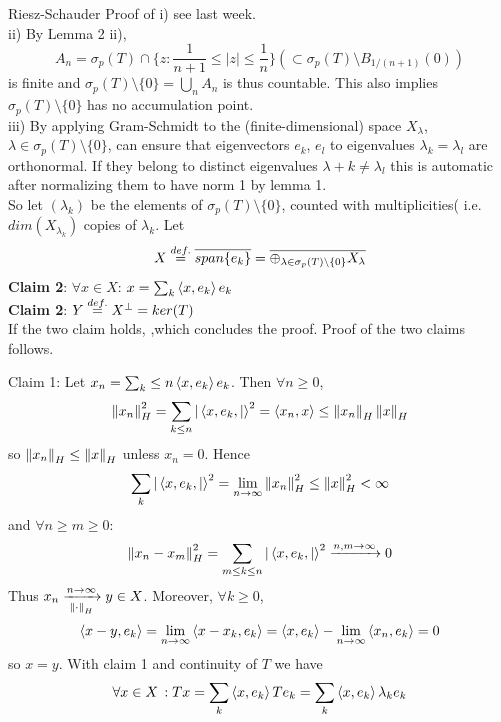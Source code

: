 \begin{pf}{Riesz-Schauder}{}
	Proof of i) see last week.\\
	ii) By Lemma 2 ii),
	$$A_n=\sigma_p(T)\cap\{z:\frac{1}{n+1}\leq|z|\leq\frac{1}{n}\}(\subset \sigma_p(T)\setminus B_{1/(n+1)}(0))$$
	is finite and $\sigma_p(T)\setminus\{0\}=\bigcup_n A_n$ is thus countable. This also implies $\sigma_p(T)\setminus\{0\}$ has no accumulation point.\\
	iii) By applying Gram-Schmidt to the (finite-dimensional) space $X_\lambda$, $\lambda\in\sigma_p(T)\setminus\{0\}$, can ensure that eigenvectors $e_k$, $e_l$ to eigenvalues $\lambda_k=\lambda_l$ are orthonormal. If they belong
	to distinct eigenvalues $\lambda+k\neq\lambda_l$ this is automatic after normalizing them to have norm 1 by lemma 1.\\
	So let $(\lambda_k)$ be the elements of $\sigma_p(T)\setminus\{0\}$, counted with multiplicities( i.e. $dim(X_{\lambda_k})$ copies of $\lambda_k$. Let
	$$
		X\stackrel{def.}{=}\overline{span\{e_k\}}=\overline{\oplus_{\lambda\in\sigma_p(T)\setminus\{0\}}X_\lambda}
	$$
	{\bf Claim 2}: $\forall x\in X$: $x=\sum_k \left<{x},{e_k}\right>e_k$\\
	{\bf Claim 2}: $Y\stackrel{def.}{=} X^\perp=ker(T)$\\
 
        If the two claim holds, \placeholder,which concludes the proof. Proof of the two claims follows.
        
\end{pf}

\begin{pf}{Claim 1}{}: Let $x_n=\sum_k\leq n \left<{x},{e_k}\right>e_k$.
	Then $\forall n\geq0$,
	$$
		\left\|{x_n}\right\|_H^2=\sum_{k\leq n}|\left<{x,e_k},{|}\right>^2=\left<{x_n},{x}\right>\leq\left\|{x_n}\right\|_H\left\|{x}\right\|_H$$
	so $\left\|{x_n}\right\|_H\leq\left\|{x}\right\|_H$ unless $x_n=0$. Hence
	$$\sum_{k}|\left<{x,e_k},{|}\right>^2=\lim_{n\to\infty}\left\|{x_n}\right\|_H^2\leq\left\|{x}\right\|_H^2<\infty$$
	and $\forall n\geq m\geq0$:
	$$\left\|{x_n-x_m}\right\|^2_H=\sum_{m\leq k\leq n}|\left<{x,e_k},{|}\right>^2\xrightarrow{n,m\to\infty}0$$
	Thus $x_n\xrightarrow[\left\|{\cdot}\right\|_H]{n\to\infty}y\in X$. Moreover, $\forall k\geq 0$,
	$$\left<{x-y},{e_k}\right>=\lim_{n\to\infty}\left<{x-x_k},{e_k}\right>=\left<{x},{e_k}\right>-\lim_{n\to\infty}\left<{x_n},{e_k}\right>=0$$
	so $x=y$. With claim 1 and continuity of $T$ we have
	$$\forall x\in X\,: Tx=\sum_k \left<{x},{e_k}\right>Te_k=\sum_k \left<{x},{e_k}\right>\lambda_ke_k$$
 \end{pf}

